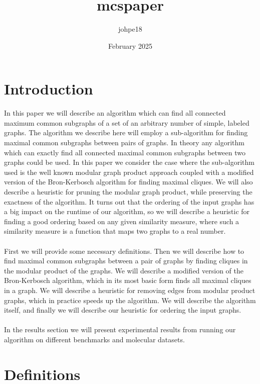 \documentclass{article}
\title{mcspaper}
\author{johpe18 }
\date{February 2025}
\begin{document}
\maketitle

\section{Introduction}


In this paper we will describe an algorithm which can find all connected maximum common subgraphs of a set of an arbitrary number of simple, labeled graphs. The algorithm we describe here will employ a sub-algorithm for finding maximal common subgraphs between pairs of graphs. In theory any algorithm which can exactly find all connected maximal common subgraphs between two graphs could be used. In this paper we consider the case where the sub-algorithm used is the well known modular graph product approach coupled with a modified version of the Bron-Kerbosch algorithm for finding maximal cliques. We will also describe a heuristic for pruning the modular graph product, while preserving the exactness of the algorithm. It turns out that the ordering of the input graphs has a big impact on the runtime of our algorithm, so we will describe a heuristic for finding a good ordering based on any given similarity measure, where such a similarity measure is a function that maps two graphs to a real number.  
\\
\\
First we will provide some necessary definitions. Then we will describe how to find maximal common subgraphs between a pair of graphs by finding cliques in the modular product of the graphs. We will describe a modified version of the Bron-Kerbosch algorithm, which in its most basic form finds all maximal cliques in a graph. We will describe a heuristic for removing edges from modular product graphs, which in practice speeds up the algorithm. We will describe the algorithm itself, and finally we will describe our heuristic for ordering the input graphs. 
\\
\\

In the results section we will present experimental results from running our algorithm on different benchmarks and molecular datasets.


\section{Definitions}
\end{document}
